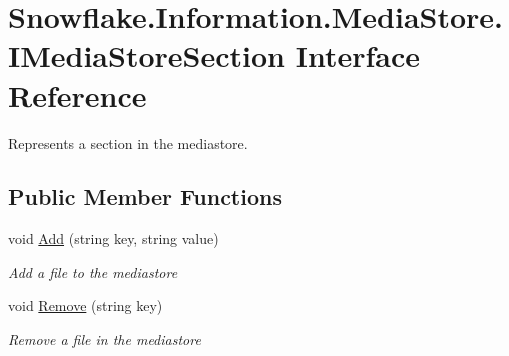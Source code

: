 \hypertarget{interface_snowflake_1_1_information_1_1_media_store_1_1_i_media_store_section}{}\section{Snowflake.\+Information.\+Media\+Store.\+I\+Media\+Store\+Section Interface Reference}
\label{interface_snowflake_1_1_information_1_1_media_store_1_1_i_media_store_section}


Represents a section in the mediastore.  


\subsection*{Public Member Functions}
\begin{DoxyCompactItemize}
\item 
void \hyperlink{interface_snowflake_1_1_information_1_1_media_store_1_1_i_media_store_section_af3dc1bd02ecb2d3338f94651480e4b30}{Add} (string key, string value)
\begin{DoxyCompactList}\small\item\em Add a file to the mediastore \end{DoxyCompactList}\item 
void \hyperlink{interface_snowflake_1_1_information_1_1_media_store_1_1_i_media_store_section_aae9c8aa021f6477d289e1d572f7a6aeb}{Remove} (string key)
\begin{DoxyCompactList}\small\item\em Remove a file in the mediastore \end{DoxyCompactList}\end{DoxyCompactItemize}
